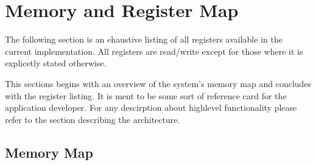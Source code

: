 
\chapter{Memory and Register Map}

The following section is an ehaustive listing of all registers available in the current implementation. All registers are read/write except for those where it is explicetly stated otherwise. 

This sections begins with an overview of the system's memory map and concludes with the register listing. It is ment to be some sort of reference card for the application developer. For any descirption about highlevel functionality please refer to the section describing the architecture.


\section{Memory Map}

